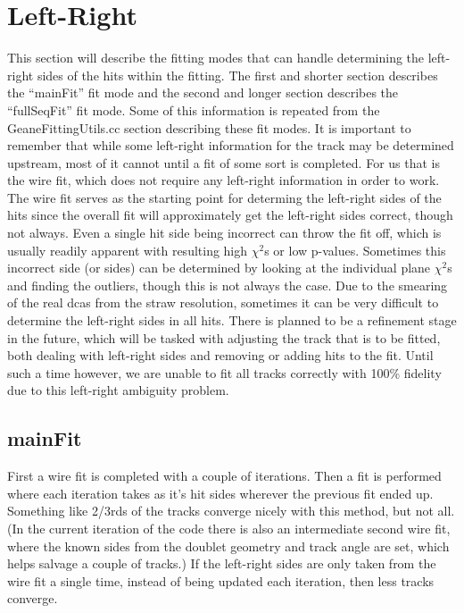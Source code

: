 \section{Left-Right}
\label{sec:LR}

	This section will describe the fitting modes that can handle determining the left-right sides of the hits within the fitting. The first and shorter section describes the ``mainFit'' fit mode and the second and longer section describes the ``fullSeqFit'' fit mode. Some of this information is repeated from the GeaneFittingUtils.cc section describing these fit modes. It is important to remember that while some left-right information for the track may be determined upstream, most of it cannot until a fit of some sort is completed. For us that is the wire fit, which does not require any left-right information in order to work. The wire fit serves as the starting point for determing the left-right sides of the hits since the overall fit will approximately get the left-right sides correct, though not always. Even a single hit side being incorrect can throw the fit off, which is usually readily apparent with resulting high $\chi^{2}$s or low p-values. Sometimes this incorrect side (or sides) can be determined by looking at the individual plane $\chi^{2}$s and finding the outliers, though this is not always the case. Due to the smearing of the real dcas from the straw resolution, sometimes it can be very difficult to determine the left-right sides in all hits. There is planned to be a refinement stage in the future, which will be tasked with adjusting the track that is to be fitted, both dealing with left-right sides and removing or adding hits to the fit. Until such a time however, we are unable to fit all tracks correctly with 100\% fidelity due to this left-right ambiguity problem.

	\subsection{mainFit}

	  First a wire fit is completed with a couple of iterations. Then a fit is performed where each iteration takes as it's hit sides wherever the previous fit ended up. Something like 2/3rds of the tracks converge nicely with this method, but not all. (In the current iteration of the code there is also an intermediate second wire fit, where the known sides from the doublet geometry and track angle are set, which helps salvage a couple of tracks.) If the left-right sides are only taken from the wire fit a single time, instead of being updated each iteration, then less tracks converge.

